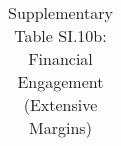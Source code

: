 \begin{longtable}{llcccccccccc}
\caption{Supplementary Table SI.10b: Financial Engagement (Extensive Margins)} \label{tab:pap__b6_suppl} \\                                                                                                                                                                                                                                                                                                                                                                                                                                                                                                                                                                                                                                                                                                                                                                               
\hline \hline                                                                                                                                                                                                                                                                                                                                                                                                                                                                                                                                                                                                                                                                                                                                                                                                                                                                             

\end{longtable}
